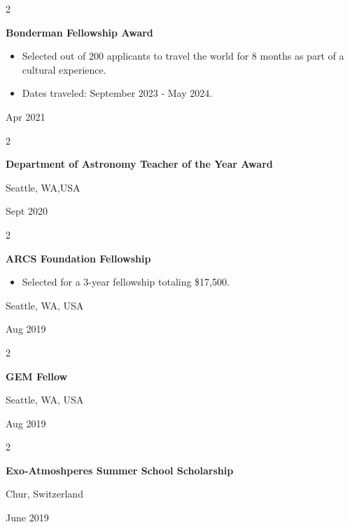 \documentclass[10pt, letterpaper]{article}
\newenvironment{highlights}{
    \begin{itemize}[
        topsep=0.10 cm,
        parsep=0.10 cm,
        partopsep=0pt,
        itemsep=0pt,
        leftmargin=0.4 cm + 10pt
    ]
}{
    \end{itemize}
} %
\newenvironment{twocolentry}[2][]{
    \onecolentry
    \def\secondColumn{#2}
    \setcolumnwidth{\fill, 4.5 cm}
    \begin{paracol}{2}
}{
    \switchcolumn \raggedleft \secondColumn
    \end{paracol}
    \endonecolentry
} %
\begin{document}
        \vspace{0.2 cm}

        \begin{twocolentry}{
            Apr 2021
        }
            \textbf{Bonderman Fellowship Award}
            \begin{highlights}
                \item Selected out of 200 applicants to travel the world for 8 months as part of a cultural experience.
                \item Dates traveled: September 2023 - May 2024.
            \end{highlights}
        \end{twocolentry}


        \vspace{0.2 cm}

        \begin{twocolentry}{
            Seattle, WA,USA

        Sept 2020
        }
            \textbf{Department of Astronomy Teacher of the Year Award}
        \end{twocolentry}


        \vspace{0.2 cm}

        \begin{twocolentry}{
            Seattle, WA, USA

        Aug 2019
        }
            \textbf{ARCS Foundation Fellowship}
            \begin{highlights}
                \item Selected for a 3-year fellowship totaling \$17,500.
            \end{highlights}
        \end{twocolentry}


        \vspace{0.2 cm}

        \begin{twocolentry}{
            Seattle, WA, USA

        Aug 2019
        }
            \textbf{GEM Fellow}
        \end{twocolentry}


        \vspace{0.2 cm}

        \begin{twocolentry}{
            Chur, Switzerland

        June 2019
        }
            \textbf{Exo-Atmoshperes Summer School Scholarship}
        \end{twocolentry}
\end{document}

